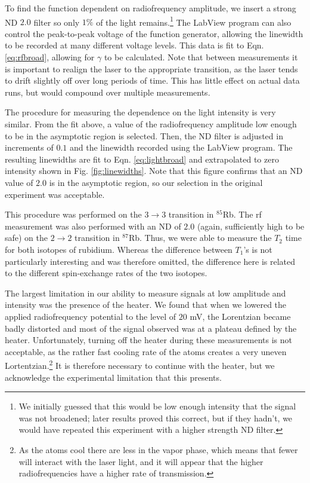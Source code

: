 To find the function dependent on radiofrequency amplitude, we insert a strong ND $2.0$ filter so only $1\%$ of the light remains.\footnote{We initially guessed that this would be low enough intensity that the signal was not broadened; later results proved this correct, but if they hadn't, we would have repeated this experiment with a higher strength ND filter.} The LabView program can also control the peak-to-peak voltage of the function generator, allowing the linewidth to be recorded at many different voltage levels. This data is fit to Eqn. \ref{eq:rfbroad}, allowing for $\gamma$ to be calculated. Note that between measurements it is important to realign the laser to the appropriate transition, as the laser tends to drift slightly off over long periods of time. This has little effect on actual data runs, but would compound over multiple measurements.

The procedure for measuring the dependence on the light intensity is very similar. From the fit above, a value of the radiofrequency amplitude low enough to be in the asymptotic region is selected. Then, the ND filter is adjusted in increments of $0.1$ and the linewidth recorded using the LabView program. The resulting linewidths are fit to Eqn. \ref{eq:lightbroad} and extrapolated to zero intensity shown in Fig. \ref{fig:linewidths}.  Note that this figure confirms that an ND value of $2.0$ is in the asymptotic region, so our selection in the original experiment was acceptable.

This procedure was performed on the $3\rightarrow3$ transition in $^{85}$Rb. The rf measurement was also performed with an ND of $2.0$ (again, sufficiently high to be safe) on the $2\rightarrow2$ transition in $^{87}$Rb. Thus, we were able to measure the $T_{2}$ time for both isotopes of rubidium. Whereas the difference between $T_{1}$'s is not particularly interesting and was therefore omitted, the difference here is related to the different spin-exchange rates of the two isotopes.

The largest limitation in our ability to measure signals at low amplitude and intensity was the presence of the heater. We found that when we lowered the applied radiofrequency potential to the level of $20$ mV, the Lorentzian became badly distorted and most of the signal observed was at a plateau defined by the heater. Unfortunately, turning off the heater during these measurements is not acceptable, as the rather fast cooling rate of the atoms creates a very uneven Lortentzian.\footnote{As the atoms cool there are less in the vapor phase, which means that fewer will interact with the laser light, and it will appear that the higher radiofrequencies have a higher rate of transmission.} It is therefore necessary to continue with the heater, but we acknowledge the experimental limitation that this presents.

